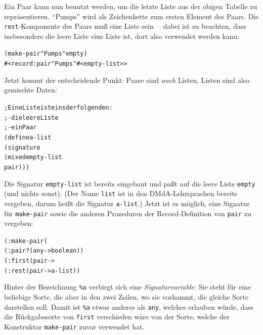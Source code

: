 Ein Paar kann nun benutzt werden, um die letzte Liste aus der obigen
Tabelle zu repräsentieren.  "`Pumps"' wird als Zeichenkette zum ersten
Element des Paars.  Die \texttt{rest}-Komponente des Paars muß eine
Liste sein~-- dabei ist zu beachten, dass insbesondere die leere Liste
eine Liste ist, dort also verwendet werden kann:
%
\begin{alltt}
(make-pair "Pumps" empty)
\evalsto{} #<record:pair "Pumps" #<empty-list>>
\end{alltt}
%
Jetzt kommt der entscheidende Punkt: Paare sind \emph{auch} Listen,
Listen sind also gemischte Daten:\label{def:a-list}
%
\begin{alltt}
; Eine Liste ist eins der folgenden:
; - die leere Liste
; - ein Paar
(define a-list
  (signature
   (mixed empty-list
          pair)))
\end{alltt}
%
Die Signatur \texttt{empty-list} ist bereits eingebaut und paßt auf
die leere Liste \texttt{empty} (und nichts sonst).  (Der Name
\texttt{list} ist in den DMdA-Lehrsprachen bereits vergeben, darum
heißt die Signatur \texttt{a-list}.)  Jetzt ist es möglich, eine
Signatur für \texttt{make-pair} sowie die anderen Prozeduren der
Record-Definition von \texttt{pair} zu vergeben:
%
\begin{alltt}
(: make-pair (%
(: pair? (any -> boolean))
(: first (pair -> %
(: rest (pair -> a-list))
\end{alltt}
%
Hinter der Bezeichnung \verb$%a$ verbirgt sich eine 
\emph{Signaturvariable}: Sie
steht für eine beliebige Sorte, die aber in den zwei Zeilen, wo sie vorkommt,
die gleiche Sorte darstellen soll.  Damit ist \verb$%a$ etwas anderes als
\texttt{any}, welches erlauben würde, dass die Rückgabesorte von \texttt{first}
verschieden wäre von der Sorte, welche der Konstruktor \texttt{make-pair} zuvor
verwendet hat.

